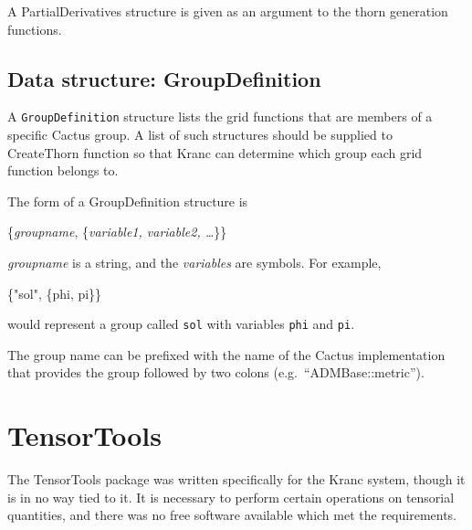\documentclass{report}
\begin{document}
A PartialDerivatives structure is given as an argument to the thorn
generation functions.

\subsection{Data structure: GroupDefinition}

A {\tt GroupDefinition} structure lists the grid functions that are
members of a specific Cactus group.  A list of such structures should
be supplied to CreateThorn function so that Kranc can determine which
group each grid function belongs to.

The form of a GroupDefinition structure is
\begin{center}
\begin{minipage}{0.8 \textwidth}
\begin{tt}
\{{\it groupname}, \{{\it variable1, variable2, \ldots}\}\}
\end{tt}
\end{minipage}
\end{center}
{\it groupname} is a string, and the {\it variables} are symbols.  For
example,
\begin{center}
\begin{minipage}{0.8 \textwidth}
\begin{tt}
\{"sol", \{phi, pi\}\}
\end{tt}
\end{minipage}
\end{center}
would represent a group called {\tt sol} with variables {\tt phi} and
{\tt pi}.

The group name can be prefixed with the name of the Cactus
implementation that provides the group followed by two colons
(e.g.~``ADMBase::metric'').  


\section{TensorTools}

The TensorTools package was written specifically for the Kranc system,
though it is in no way tied to it.  It is necessary to perform certain
operations on tensorial quantities, and there was no free software
available which met the requirements.

\end{document}
